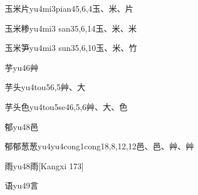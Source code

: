 \begin{EntryWithPhonetic}{玉米片}{yu4mi3pian4}{5,6,4}{⽟、⽶、⽚}
\end{EntryWithPhonetic}

\begin{EntryWithPhonetic}{玉米糁}{yu4mi3 san3}{5,6,14}{⽟、⽶、⽶}
\end{EntryWithPhonetic}

\begin{EntryWithPhonetic}{玉米笋}{yu4mi3 sun3}{5,6,10}{⽟、⽶、⽵}
\end{EntryWithPhonetic}

\begin{EntryWithPhonetic}{芋}{yu4}{6}{⾋}
\end{EntryWithPhonetic}

\begin{EntryWithPhonetic}{芋头}{yu4tou5}{6,5}{⾋、⼤}
\end{EntryWithPhonetic}

\begin{EntryWithPhonetic}{芋头色}{yu4tou5se4}{6,5,6}{⾋、⼤、⾊}
\end{EntryWithPhonetic}

\begin{EntryWithPhonetic}{郁}{yu4}{8}{⾢}
\end{EntryWithPhonetic}

\begin{EntryWithPhonetic}{郁郁葱葱}{yu4yu4cong1cong1}{8,8,12,12}{⾢、⾢、⾋、⾋}
\end{EntryWithPhonetic}

\begin{EntryWithPhonetic}{雨}{yu4}{8}{⾬}[Kangxi 173]
\end{EntryWithPhonetic}

\begin{EntryWithPhonetic}{语}{yu4}{9}{⾔}
\end{EntryWithPhonetic}

